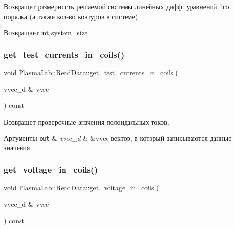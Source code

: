 Возвращет размерность решаемой системы линейных дифф. уравнений 1го порядка (а также кол-\/во контуров в системе) \begin{DoxyReturn}{Возвращает}
int system\+\_\+size 
\end{DoxyReturn}
\mbox{\label{class_plasma_lab_1_1_read_data_a58e50ce27134e98096e7922c4efdc926}} 
\subsubsection{\texorpdfstring{get\+\_\+test\+\_\+currents\+\_\+in\+\_\+coils()}{get\_test\_currents\_in\_coils()}}
{\footnotesize\ttfamily void Plasma\+Lab\+::\+Read\+Data\+::get\+\_\+test\+\_\+currents\+\_\+in\+\_\+coils (\begin{DoxyParamCaption}\item[{vvec\+\_\+d \&}]{vvec }\end{DoxyParamCaption}) const\hspace{0.3cm}{\ttfamily [inline]}}

Возвращет проверочные значения полоидальных токов. 
\begin{DoxyParams}[1]{Аргументы}
\mbox{\tt out}  & {\em vvec\+\_\+d} & \&vvec вектор, в который записываются данные значения \\
\hline
\end{DoxyParams}
\mbox{\label{class_plasma_lab_1_1_read_data_a3c22330a1649b5a6727f7c06c822196e}} 
\subsubsection{\texorpdfstring{get\+\_\+voltage\+\_\+in\+\_\+coils()}{get\_voltage\_in\_coils()}}
{\footnotesize\ttfamily void Plasma\+Lab\+::\+Read\+Data\+::get\+\_\+voltage\+\_\+in\+\_\+coils (\begin{DoxyParamCaption}\item[{vvec\+\_\+d \&}]{vvec }\end{DoxyParamCaption}) const\hspace{0.3cm}{\ttfamily [inline]}}

